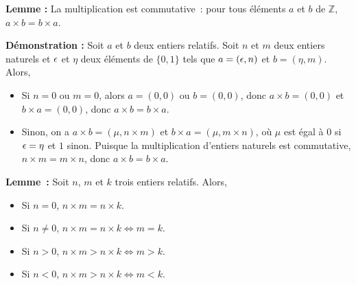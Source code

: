     \done

\medskip

\noindent\textbf{Lemme :} La multiplication est commutative : pour tous éléments $a$ et $b$ de $\mathbb{Z}$, $a \times b = b \times a$.

\medskip

\noindent\textbf{Démonstration :} Soit $a$ et $b$ deux entiers relatifs. 
    Soit $n$ et $m$ deux entiers naturels et $\epsilon$ et $\eta$ deux éléments de $\lbrace 0, 1 \rbrace$ tels que $a = (\epsilon, n)$ et $b = (\eta, m)$. 
    Alors, 
    \begin{itemize}[nosep]
        \item Si $n = 0$ ou $m = 0$, alors $a=(0,0)$ ou $b=(0,0)$, donc $a \times b = (0,0)$ et $b \times a = (0,0)$, donc $a \times b = b \times a$. 
        \item Sinon, on a $a \times b = (\mu, n \times m)$ et $b \times a = (\mu, m \times n)$, où $\mu$ est égal à $0$ si $\epsilon = \eta$ et $1$ sinon.
            Puisque la multiplication d'entiers naturels est commutative, $n \times m = m \times n$, donc $a \times b = b \times a$.
    \end{itemize}

   \done 

\medskip

\noindent\textbf{Lemme :} Soit $n$, $m$ et $k$ trois entiers relatifs. 
    Alors, 
    \begin{itemize}[nosep]
        \item Si $n = 0$, $n \times m = n \times k$.
        \item Si $n \neq 0$, $n \times m = n \times k \Leftrightarrow m = k$.
        \item Si $n > 0$, $n \times m > n \times k \Leftrightarrow m > k$.
        \item Si $n < 0$, $n \times m > n \times k \Leftrightarrow m < k$.
    \end{itemize}

\medskip

